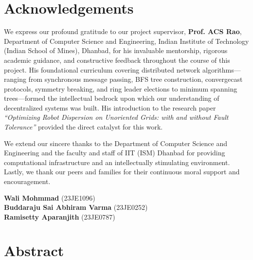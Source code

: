 \documentclass[11pt,a4paper]{report}
\begin{document}
\chapter*{Acknowledgements}

We express our profound gratitude to our project supervisor, \textbf{Prof. ACS Rao}, Department of Computer Science and Engineering, Indian Institute of Technology (Indian School of Mines), Dhanbad, for his invaluable mentorship, rigorous academic guidance, and constructive feedback throughout the course of this project. His foundational curriculum covering distributed network algorithms---ranging from synchronous message passing, BFS tree construction, convergecast protocols, symmetry breaking, and ring leader elections to minimum spanning trees---formed the intellectual bedrock upon which our understanding of decentralized systems was built. His introduction to the research paper \emph{``Optimizing Robot Dispersion on Unoriented Grids: with and without Fault Tolerance''} provided the direct catalyst for this work.

We extend our sincere thanks to the Department of Computer Science and Engineering and the faculty and staff of IIT (ISM) Dhanbad for providing computational infrastructure and an intellectually stimulating environment. Lastly, we thank our peers and families for their continuous moral support and encouragement.

\vspace{1.5cm}
\noindent
\textbf{Wali Mohmmad} (23JE1096)\\
\textbf{Buddaraju Sai Abhiram Varma} (23JE0252)\\
\textbf{Ramisetty Aparanjith} (23JE0787)

\newpage

\chapter*{Abstract}
\end{document}
